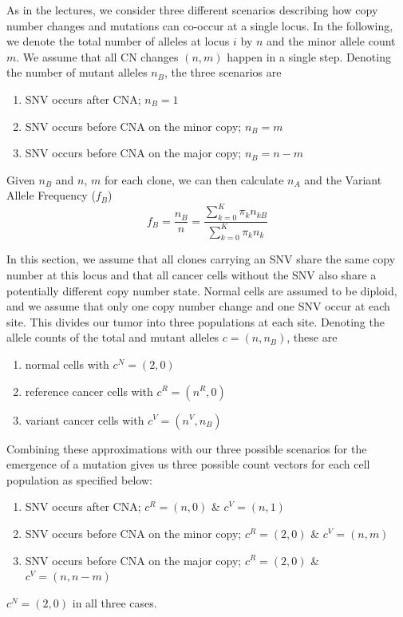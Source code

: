 \documentclass{article}
\begin{document}
As in the lectures, we consider three different scenarios describing how copy number changes and mutations can co-occur at a single locus. In the following, we denote the total number of alleles at locus $i$  by $n$ and the minor allele count $m$. We assume that all CN changes $(n, m)$ happen in a single step. Denoting the number of mutant alleles $n_B$, the three scenarios are
\begin{enumerate}
\item
SNV occurs after CNA; $n_B = 1$

\item
SNV occurs before CNA on the minor copy; $n_B = m$

\item
SNV occurs before CNA on the major copy; $n_B = n-m$

\end{enumerate}

Given $n_B$ and $n$, $m$ for each clone, we can then calculate $n_A$ and the Variant Allele Frequency ($f_B$) 
\begin{equation}
f_B = \dfrac{n_B}{n} = \dfrac{\sum_{k = 0}^K{\pi_k n_{kB}}}{\sum_{k = 0}^K{\pi_k n_{k}}}
\end{equation}

In this section, we assume that all clones carrying an SNV share the same copy number at this locus and that all cancer cells without the SNV also share a potentially different copy number state. Normal cells are assumed to be diploid, and we assume that only one copy number change and one SNV occur at each site. This divides our tumor into three populations at each site. Denoting the allele counts of the total and mutant alleles $c = (n, n_B)$, these are
\begin{enumerate}
\item
normal cells with $c^N = (2,0)$

\item
reference cancer cells with $c^R = (n^R,0)$

\item
variant cancer cells with $c^V = (n^V,n_B)$
\end{enumerate}

Combining these approximations with our three possible scenarios for the emergence of a mutation gives us three possible count vectors for each cell population as specified below:
\begin{enumerate}
\item
SNV occurs after CNA; $c^R = (n, 0)$ \& $c^V = (n, 1)$

\item
SNV occurs before CNA on the minor copy; $c^R = (2, 0)$ \& $c^V = (n, m)$

\item
SNV occurs before CNA on the major copy; $c^R = (2, 0)$ \& $c^V = (n, n-m)$
\end{enumerate}
$c^N = (2,0)$ in all three cases.
\end{document}
